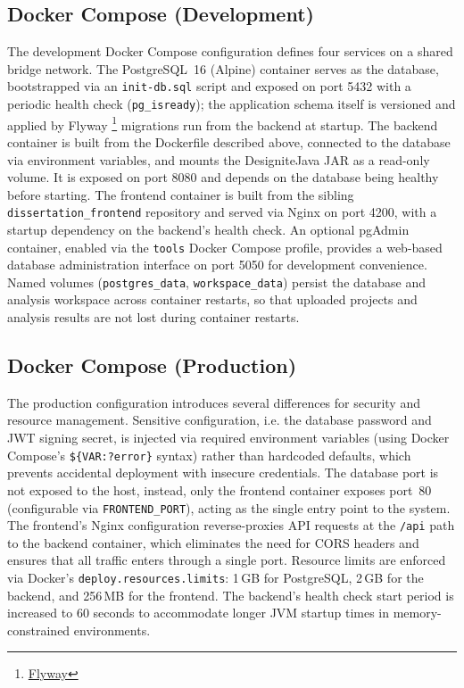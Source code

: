 \subsection{Docker Compose (Development)}
\label{subsec:docker-dev}

 \par The development Docker Compose configuration defines four services on a shared bridge network. The PostgreSQL~16 (Alpine) container serves as the database, bootstrapped via an \texttt{init-db.sql} script and exposed on port 5432 with a periodic health check (\texttt{pg\_isready}); the application schema itself is versioned and applied by Flyway \footnote{\href{https://github.com/flyway/flyway}{Flyway}} migrations run from the backend at startup. The backend container is built from the Dockerfile described above, connected to the database via environment variables, and mounts the DesigniteJava JAR as a read-only volume. It is exposed on port 8080 and depends on the database being healthy before starting. The frontend container is built from the sibling \texttt{dissertation\_frontend} repository and served via Nginx on port 4200, with a startup dependency on the backend's health check. An optional pgAdmin container, enabled via the \texttt{tools} Docker Compose profile, provides a web-based database administration interface on port 5050 for development convenience. Named volumes (\texttt{postgres\_data}, \texttt{workspace\_data}) persist the database and analysis workspace across container restarts, so that uploaded projects and analysis results are not lost during container restarts.

\subsection{Docker Compose (Production)}
\label{subsec:docker-prod}

 \par The production configuration introduces several differences for security and resource management. Sensitive configuration, i.e. the database password and JWT signing secret, is injected via required environment variables (using Docker Compose's \texttt{\$\{VAR:?error\}} syntax) rather than hardcoded defaults, which prevents accidental deployment with insecure credentials. The database port is not exposed to the host, instead, only the frontend container exposes port~80 (configurable via \texttt{FRONTEND\_PORT}), acting as the single entry point to the system. The frontend's Nginx configuration reverse-proxies API requests at the \texttt{/api} path to the backend container, which eliminates the need for CORS headers and ensures that all traffic enters through a single port. Resource limits are enforced via Docker's \texttt{deploy\-.resources\-.limits}: 1\,GB for PostgreSQL, 2\,GB for the backend, and 256\,MB for the frontend. The backend's health check start period is increased to 60 seconds to accommodate longer JVM startup times in memory-constrained environments.


